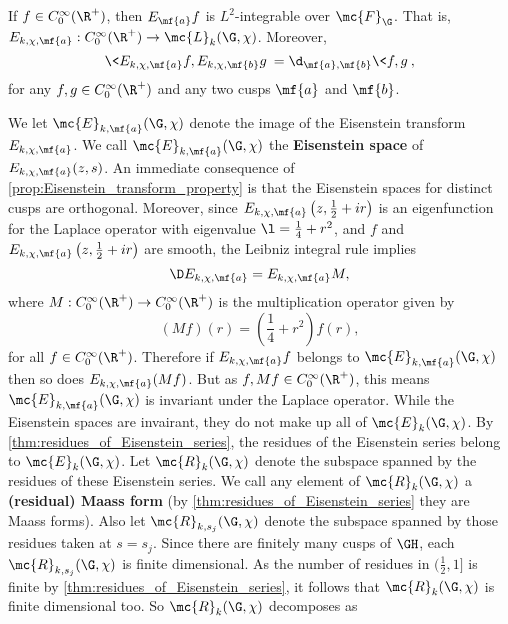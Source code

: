     \begin{proposition}\label{prop:Eisenstein_transform_property}
      If $f \in C_{0}^{\infty}(\R^{+})$, then $E_{\mf{a}}f$ is $L^{2}$-integrable over $\mc{F}_{\G}$. That is, $E_{k,\chi,\mf{a}}:C_{0}^{\infty}(\R^{+}) \to \mc{L}_{k}(\G,\chi)$. Moreover,
      \[
        \<E_{k,\chi,\mf{a}}f,E_{k,\chi,\mf{b}}g\> = \d_{\mf{a},\mf{b}}\<f,g\>,
      \]
      for any $f,g \in C_{0}^{\infty}(\R^{+})$ and any two cusps $\mf{a}$ and $\mf{b}$.
    \end{proposition}

    We let $\mc{E}_{k,\mf{a}}(\G,\chi)$ denote the image of the Eisenstein transform $E_{k,\chi,\mf{a}}$. We call $\mc{E}_{k,\mf{a}}(\G,\chi)$ the \textbf{Eisenstein space} of $E_{k,\chi,\mf{a}}(z,s)$. An immediate consequence of \cref{prop:Eisenstein_transform_property} is that the Eisenstein spaces for distinct cusps are orthogonal. Moreover, since $E_{k,\chi,\mf{a}}\left(z,\frac{1}{2}+ir\right)$ is an eigenfunction for the Laplace operator with eigenvalue $\l = \frac{1}{4}+r^{2}$, and $f$ and $E_{k,\chi,\mf{a}}\left(z,\frac{1}{2}+ir\right)$ are smooth, the Leibniz integral rule implies
    \[
      \D E_{k,\chi,\mf{a}}= E_{k,\chi,\mf{a}}M,
    \]
    where $M:C_{0}^{\infty}(\R^{+}) \to C_{0}^{\infty}(\R^{+})$ is the multiplication operator given by
    \[
      (Mf)(r) = \left(\frac{1}{4}+r^{2}\right)f(r),
    \]
    for all $f \in C_{0}^{\infty}(\R^{+})$. Therefore if $E_{k,\chi,\mf{a}}f$ belongs to $\mc{E}_{k,\mf{a}}(\G,\chi)$ then so does $E_{k,\chi,\mf{a}}(Mf)$. But as $f,Mf \in C_{0}^{\infty}(\R^{+})$, this means $\mc{E}_{k,\mf{a}}(\G,\chi)$ is invariant under the Laplace operator. While the Eisenstein spaces are invairant, they do not make up all of $\mc{E}_{k}(\G,\chi)$. By \cref{thm:residues_of_Eisenstein_series}, the residues of the Eisenstein series belong to $\mc{E}_{k}(\G,\chi)$. Let $\mc{R}_{k}(\G,\chi)$ denote the subspace spanned by the residues of these Eisenstein series. We call any element of $\mc{R}_{k}(\G,\chi)$ a \textbf{(residual) Maass form} (by \cref{thm:residues_of_Eisenstein_series} they are Maass forms). Also let $\mc{R}_{k,s_{j}}(\G,\chi)$ denote the subspace spanned by those residues taken at $s = s_{j}$. Since there are finitely many cusps of $\GH$, each $\mc{R}_{k,s_{j}}(\G,\chi)$ is finite dimensional. As the number of residues in $(\frac{1}{2},1]$ is finite by \cref{thm:residues_of_Eisenstein_series}, it follows that $\mc{R}_{k}(\G,\chi)$ is finite dimensional too. So $\mc{R}_{k}(\G,\chi)$ decomposes as
